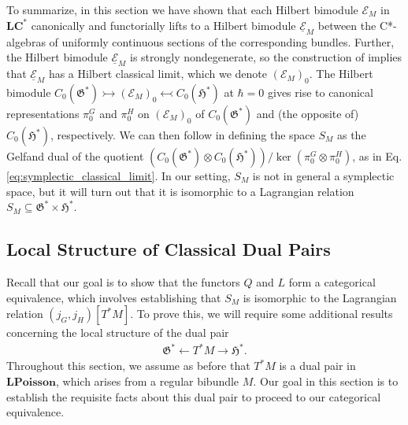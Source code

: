 \documentclass[sn-mathphys,Numbered]{sn-jnl}
\begin{document}
To summarize, in this section we have shown that each Hilbert bimodule $\mathcal{E}_M$ in $\mathbf{LC^*}$ canonically and functorially lifts to a Hilbert bimodule $\underline{\mathcal{E}}_M$ between the C*-algebras of uniformly continuous sections of the corresponding bundles.  Further, the Hilbert bimodule $\underline{\mathcal{E}}_M$ is strongly nondegenerate, so the construction of \citet{FeSt24} implies that $\underline{\mathcal{E}}_M$ has a Hilbert classical limit, which we denote $(\mathcal{E}_M)_0$.  The Hilbert bimodule $C_0(\mathfrak{G}^*)\rightarrowtail (\mathcal{E}_M)_0\leftarrowtail C_0(\mathfrak{H}^*)$ at $\hbar = 0$ gives rise to canonical representations $\pi^G_0$ and $\pi^H_0$ on $(\mathcal{E}_M)_0$ of $C_0(\mathfrak{G}^*)$ and (the opposite of) $C_0(\mathfrak{H}^*)$, respectively. We can then follow \citet{FeSt24} in defining the space $S_M$ as the Gelfand dual of the quotient $(C_0(\mathfrak{G}^*)\otimes C_0(\mathfrak{H}^*))/\ker\left(\pi^G_0\otimes \pi^H_0\right)$, as in Eq.\eqref{eq:symplectic_classical_limit}.  In our setting, $S_M$ is not in general a symplectic space, but it will turn out that it is isomorphic to a Lagrangian relation $S_M\subseteq \mathfrak{G}^*\times\mathfrak{H}^*$.

\subsection{Local Structure of Classical Dual Pairs}

Recall that our goal is to show that the functors $Q$ and $L$ form a categorical equivalence, which involves establishing that $S_M$ is isomorphic to the Lagrangian relation $(j_G,j_H)[T^*M]$.  To prove this, we will require some additional results concerning the local structure of the dual pair
\begin{align}
    \mathfrak{G}^*\leftarrow T^*M\rightarrow \mathfrak{H}^*.
\end{align}
Throughout this section, we assume as before that $T^*M$ is a dual pair in $\mathbf{LPoisson}$, which arises from a regular bibundle $M$.  Our goal in this section is to establish the requisite facts about this dual pair to proceed to our categorical equivalence.
\end{document}
